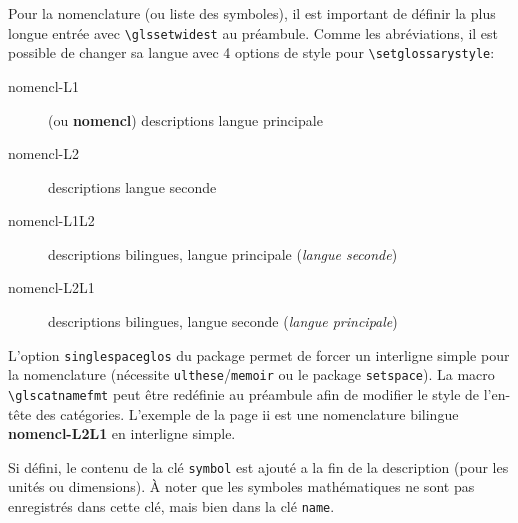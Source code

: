 \documentclass[projet,nohyperref,english,french]{ulthese}
\begin{document}
Pour la nomenclature (ou liste des symboles), il est important de définir la plus longue entrée avec \texttt{\textbackslash glssetwidest} au préambule.
Comme les abréviations, il est possible de changer sa langue avec 4 options de style pour \texttt{\textbackslash setglossarystyle}:
\begin{description}
	\item[nomencl-L1] (ou \textbf{nomencl}) descriptions langue principale
	\item[nomencl-L2] descriptions langue seconde
	\item[nomencl-L1L2] descriptions bilingues, langue principale (\textit{langue seconde})
	\item[nomencl-L2L1] descriptions bilingues, langue seconde (\textit{langue principale})
\end{description}
L'option \texttt{singlespaceglos} du package permet de forcer un interligne simple pour la nomenclature (nécessite \texttt{ulthese}/\texttt{memoir} ou le package \texttt{setspace}). La macro \texttt{\textbackslash glscatnamefmt} peut être redéfinie au préambule afin de modifier le style de l'en-tête des catégories. L'exemple de la page ii est une nomenclature bilingue \textbf{nomencl-L2L1} en interligne simple.

Si défini, le contenu de la clé \texttt{symbol} est ajouté a la fin de la description (pour les unités ou dimensions). À noter que les symboles mathématiques ne sont pas enregistrés dans cette clé, mais bien dans la clé \texttt{name}.
\end{document}

